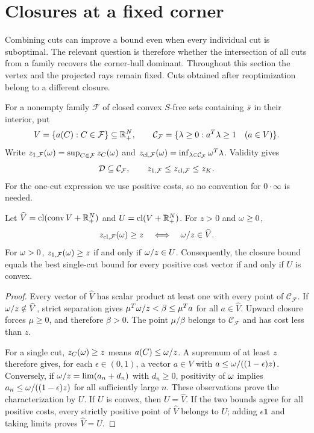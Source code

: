 \section{Closures at a fixed corner}\label{cl:section}

Combining cuts can improve a bound even when every individual cut is
suboptimal. The relevant question is therefore whether the intersection of
all cuts from a family recovers the corner-hull dominant. Throughout this
section the vertex and the projected rays remain fixed. Cuts obtained after
reoptimization belong to a different closure.

For a nonempty family $\mathcal F$ of closed convex $S$-free sets containing
$\bar s$ in their interior, put
\[
 V=\{a(C):C\in\mathcal F\}\subseteq\mathbb R_+^N,\qquad
 \mathcal C_{\mathcal F}=\{\lambda\ge0:a^T\lambda\ge1\quad(a\in V)\}.
\]
Write $z_{1,\mathcal F}(\omega)=\sup_{C\in\mathcal F}z_C(\omega)$ and
$z_{\mathrm{cl},\mathcal F}(\omega)=\inf_{\lambda\in\mathcal C_{\mathcal F}}
\omega^T\lambda$. Validity gives
\begin{equation}\label{cl:basic-bounds}
 \mathcal D\subseteq\mathcal C_{\mathcal F},\qquad
 z_{1,\mathcal F}\le z_{\mathrm{cl},\mathcal F}\le z_K.
\end{equation}
For the one-cut expression we use positive costs, so no convention for
$0\cdot\infty$ is needed.

\begin{lemma}\label{cl:blocking}
Let $\widehat V=\operatorname{cl}(\operatorname{conv} V+\mathbb R_+^N)$ and $U=\operatorname{cl}(V+\mathbb R_+^N)$.
For $z>0$ and $\omega\ge0$,
\[
 z_{\mathrm{cl},\mathcal F}(\omega)\ge z
 \quad\Longleftrightarrow\quad \omega/z\in\widehat V.
\]
For $\omega>0$, $z_{1,\mathcal F}(\omega)\ge z$ if and only if
$\omega/z\in U$. Consequently, the closure bound equals the best single-cut
bound for every positive cost vector if and only if $U$ is convex.
\end{lemma}

\begin{proof}
Every vector of $\widehat V$ has scalar product at least one with every
point of $\mathcal C_{\mathcal F}$. If $\omega/z\notin\widehat V$, strict
separation gives $\mu^T\omega/z<\beta\le\mu^Ta$ for all
$a\in\widehat V$. Upward closure forces $\mu\ge0$, and therefore
$\beta>0$. The point $\mu/\beta$ belongs to $\mathcal C_{\mathcal F}$ and
has cost less than $z$.

For a single cut, $z_C(\omega)\ge z$ means $a(C)\le\omega/z$.
A supremum of at least $z$ therefore gives, for each $\epsilon\in(0,1)$,
a vector $a\in V$ with $a\le\omega/((1-\epsilon)z)$.
Conversely, if $\omega/z=\lim(a_n+d_n)$ with $d_n\ge0$, positivity of
$\omega$ implies $a_n\le\omega/((1-\epsilon)z)$ for all sufficiently large $n$.
These observations prove the characterization by $U$. If $U$ is convex,
then $U=\widehat V$. If the two bounds agree for all positive costs, every
strictly positive point of $\widehat V$ belongs to $U$; adding
$\epsilon\mathbf1$ and taking limits proves $\widehat V=U$.
\end{proof}

